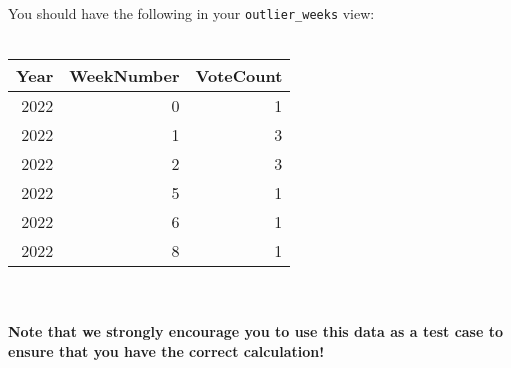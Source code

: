 \documentclass{article}
\begin{document}
  You should have the following in your \texttt{outlier\_weeks} view: \\
  \\
  \begin{tabular}{|r|r|r|}
  \hline
  Year & WeekNumber & VoteCount \\
  \hline
    2022 &  0 &  1 \\
    2022 &  1 &  3 \\
    2022 &  2 &  3 \\
    2022 &  5 &  1 \\
    2022 &  6 &  1 \\
    2022 &  8 &  1 \\
  \hline
  \end{tabular}
    \\
    \\
  \textbf{Note that we strongly encourage you to use this data as a test case to ensure that you have the correct calculation!}
\end{document}
